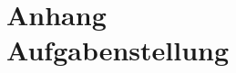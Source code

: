 \addtocounter{chapter}{1}
\chapter*{Anhang \thechapter\\[1.2cm] Aufgabenstellung}
\label{Aufgabenstellung}
\clearpage
\lhead{}
\ 
\cleardoublepage